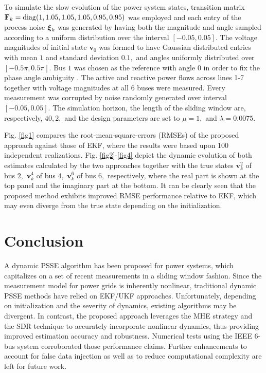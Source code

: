 \documentclass[conference]{IEEEtran}
\def\bbF{{\ensuremath{\mathbf F}}}
\def\bbv{{\ensuremath{\mathbf v}}}
\def\bbxi{{\mbox{\boldmath $\xi$}}}
\begin{document}
 To simulate the slow evolution of the power system states, transition matrix $\bbF_k={\rm{diag}}(1,1.05,1.05,1.05,0.95,0.95)$ was employed and each entry of the process noise $\bbxi_k$ was generated by having both the magnitude and angle sampled according to a uniform distribution over the interval $[-0.05, 0.05].$
 The voltage magnitudes of initial state $\bbv_0$ was formed to have Gaussian distributed entries with mean $1$ and standard deviation $0.1,$ and angles uniformly distributed over $[-0.5\pi,0.5\pi].$ Bus $1$ was chosen as the reference with angle $0$ in order to fix the phase angle ambiguity \cite{naps:zhu2011}. The active and reactive power flows across lines 1-7 together with voltage magnitudes at all 6 buses were measured. Every measurement was corrupted by noise randomly generated over interval $[-0.05,0.05].$  The simulation horizon, the length of the sliding window are, respectively, $40, 2,$ and the design parameters are set to $\mu=1,$ and $\lambda=0.0075.$

Fig. \ref{fig1} compares the root-mean-square-errors (RMSEs) of the proposed approach against those of EKF, where the results were based upon 100 independent realizations. Fig. \ref{fig2}-\ref{fig4} depict the dynamic evolution of both estimates calculated by the two approaches together with the true states $\bbv_k^2$ of bus $2,$  $\bbv_k^4$ of bus $4,$ $\bbv_k^6$ of bus $6,$ respectively, where the real part is shown at the top panel and the imaginary part at the bottom. It can be clearly seen that the proposed method exhibits improved RMSE performance relative to EKF, which may even diverge from the true state depending on the initialization.



\section{Conclusion}
\label{sec6}
A dynamic PSSE algorithm has been proposed for power systems, which capitalizes on a set of recent measurements in a sliding window fashion. Since the measurement model for power grids is inherently nonlinear, traditional dynamic PSSE methods have relied on EKF/UKF approaches. Unfortunately, depending on initialization and the severity of dynamics, existing algorithms may be divergent. In contrast, the proposed approach leverages the MHE strategy and the SDR technique to accurately incorporate nonlinear dynamics, thus providing improved estimation accuracy and robustness. Numerical tests using the IEEE 6-bus system corroborated those performance claims. Further enhancements to account for false data injection as well as to reduce computational complexity are left for future work. 
\end{document}
